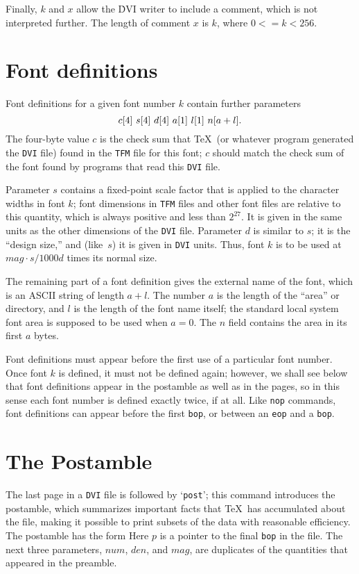 \documentclass{article}
\begin{document}
Finally, $k$ and $x$ allow the \.{DVI} writer to include a comment, which is not
interpreted further. The length of comment $x$ is $k$, where $0<=k<256$.


\section{Font definitions}
\label{sec:fontDef}

Font definitions for a given font number $k$ contain further parameters
$$\hbox{$c[4]$ $s[4]$ $d[4]$ $a[1]$ $l[1]$ $n[a+l]$.}$$
The four-byte value $c$ is the check sum that \TeX\ (or whatever program
generated the \texttt{DVI} file) found in the \texttt{TFM} file for this font;
$c$ should match the check sum of the font found by programs that read
this \texttt{DVI} file.


Parameter $s$ contains a fixed-point scale factor that is applied to the
character widths in font $k$; font dimensions in \texttt{TFM} files and other
font files are relative to this quantity, which is always positive and
less than $2^{27}$. 
It is given in the same units as the other dimensions of the \texttt{DVI} file. 
Parameter $d$ is similar to $s$; it is the ``design size,'' 
and (like~$s$) it is given in \texttt{DVI} units. 
Thus, font $k$ is to be used at $mag\cdot s/1000d$ times its normal size.

The remaining part of a font definition gives the external name of the font,
which is an ASCII string of length $a+l$. The number $a$ is the length
of the ``area'' or directory, and $l$ is the length of the font name itself;
the standard local system font area is supposed to be used when $a=0$.
The $n$ field contains the area in its first $a$ bytes.

Font definitions must appear before the first use of a particular font number.
Once font $k$ is defined, it must not be defined again; 
however, we shall see below 
that font definitions appear in the postamble as well as in the pages, 
so in this sense each font number is defined exactly twice, if at all. 
Like \texttt{nop} commands, 
font definitions can appear before the first \texttt{bop}, 
or between an \texttt{eop} and a \texttt{bop}. 

\section{The Postamble}
\label{sec:postamble}

The last page in a \texttt{DVI} file is followed by `\texttt{post}'; 
this command introduces the postamble, 
which summarizes important facts that \TeX\ has accumulated about the file, 
making it possible to print subsets of the data with reasonable efficiency. 
The postamble has the form
Here $p$ is a pointer to the final \texttt{bop} in the file. The next three
parameters, $num$, $den$, and $mag$, are duplicates of the quantities that
appeared in the preamble.
\end{document}
